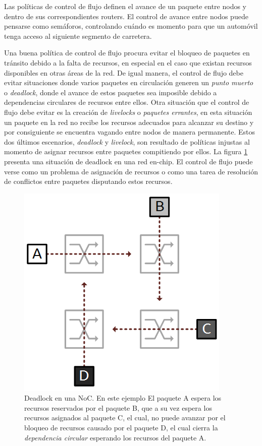 Las políticas de control de flujo definen el avance de un paquete entre nodos y dentro de sus correspondientes routers. El control de avance entre nodos puede pensarse como semáforos, controlando cuándo es momento para que un automóvil tenga acceso al siguiente segmento de carretera.

Una buena política de control de flujo procura evitar el bloqueo de paquetes en tránsito debido a la falta de recursos, en especial en el caso que existan recursos disponibles en otras áreas de la red. De igual manera, el control de flujo debe evitar situaciones donde varios paquetes en circulación generen un \textit{punto muerto} o \textit{deadlock}, donde el avance de estos paquetes sea imposible debido a dependencias circulares de recursos entre ellos. Otra situación que el control de flujo debe evitar es la creación de \textit{livelocks} o \textit{paquetes errantes}, en esta situación un paquete en la red no recibe los recursos adecuados para alcanzar su destino y por consiguiente se encuentra vagando entre nodos de manera permanente. Estos dos últimos escenarios, \textit{deadlock} y \textit{livelock}, son resultado de políticas injustas al momento de asignar recursos entre paquetes compitiendo por ellos. La figura \ref{fig:ch1_deadlock} presenta una situación de deadlock en una red en-chip. El control de flujo puede verse como un problema de asignación de recursos o como una tarea de resolución de conflictos entre paquetes disputando estos recursos.

\begin{figure}
	\begin{center}
		\includegraphics[scale=0.7]{figures/ch1_deadlock.png}
	\end{center}
	\caption
		{	
			Deadlock en una NoC. En este ejemplo El paquete A espera los recursos reservados por el paquete B, que a su vez espera los recursos asignados al paquete C, el cual, no puede avanzar por el bloqueo de recursos causado por el paquete D, el cual cierra la \textit{dependencia circular} esperando los recursos del paquete A.
		}
	\label{fig:ch1_deadlock}
\end{figure}

